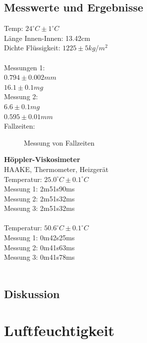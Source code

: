 \documentclass[12pt,a4paper]{article}
\begin{document}
\begin{multicols}{2}
\subsection{Messwerte und Ergebnisse}
Temp: $24^{\circ}C \pm 1^{\circ}C$\\
Länge Innen-Innen: 13.42cm\\
Dichte Flüssigkeit: $1225 \pm 5 kg/m^2$\\
\\
Messungen 1:\\
$0.794 \pm 0.002mm$\\
$16.1 \pm 0.1 mg$\\
Messung 2:\\
$6.6 \pm 0.1mg$\\
$0.595 \pm 0.01mm$\\
Fallzeiten:\\
\begin{figure}[H]
	\centering
	\caption{Messung von Fallzeiten}
	\label{fig:visko_fallzeit}
\end{figure}
\noindent
\textbf{Höppler-Viskosimeter}\\
HAAKE, Thermometer, Heizgerät\\
Temperatur: $25.0^{\circ}C \pm 0.1^{\circ}C$\\
Messung 1: 2m51s90ms\\
Messung 2: 2m51s32ms\\
Messung 3: 2m51s32ms\\
\\
Temperatur: $50.6^{\circ}C \pm 0.1^{\circ}C$\\
Messung 1: 0m42s25ms\\
Messung 2: 0m41s63ms\\
Messung 3: 0m41s78ms\\
\\
\subsection{Diskussion}


\section{Luftfeuchtigkeit}


\end{multicols}
\end{document}
